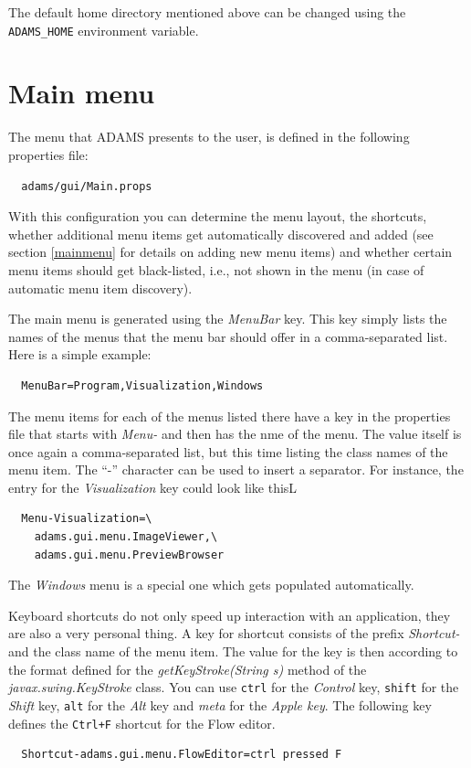 \noindent The default home directory mentioned above can be changed using
the \texttt{ADAMS\_HOME} environment variable.

\section{Main menu}
The menu that ADAMS presents to the user, is defined in the following properties
file:
\begin{verbatim}
  adams/gui/Main.props
\end{verbatim}
With this configuration you can determine the menu layout, the shortcuts, whether additional
menu items get automatically discovered and added (see section \ref{mainmenu}
for details on adding new menu items) and whether certain menu items should
get black-listed, i.e., not shown in the menu (in case of automatic menu
item discovery).

The main menu is generated using the \textit{MenuBar} key. This key simply lists
the names of the menus that the menu bar should offer in a comma-separated
list. Here is a simple example:
\begin{verbatim}
  MenuBar=Program,Visualization,Windows
\end{verbatim}
The menu items for each of the menus listed there have a key in the properties
file that starts with \textit{Menu-} and then has the nme of the menu. The value
itself is once again a comma-separated list, but this time listing the class
names of the menu item. The ``-'' character can be used to insert a separator.
For instance, the entry for the \textit{Visualization} key could look like thisL
\begin{verbatim}
  Menu-Visualization=\
    adams.gui.menu.ImageViewer,\
    adams.gui.menu.PreviewBrowser
\end{verbatim}
The \textit{Windows} menu is a special one which gets populated automatically.

\heading{Shortcuts}
Keyboard shortcuts do not only speed up interaction with an application, they
are also a very personal thing. A key for shortcut consists of the prefix
\textit{Shortcut-} and the class name of the menu item. The value for the
key is then according to the format defined for the \textit{getKeyStroke(String s)}
method of the \textit{javax.swing.KeyStroke} class. You can use \texttt{ctrl}
for the \textit{Control} key, \texttt{shift} for the \textit{Shift} key,
\texttt{alt} for the \textit{Alt} key and \textit{meta} for the
\textit{Apple key}. The following key defines the \texttt{Ctrl+F} shortcut
for the Flow editor.
\begin{verbatim}
  Shortcut-adams.gui.menu.FlowEditor=ctrl pressed F
\end{verbatim}

